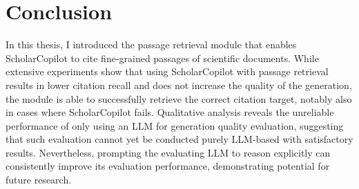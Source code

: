 \chapter{Conclusion}\label{conclusion}
In this thesis, I introduced the passage retrieval module that enables ScholarCopilot to cite fine-grained passages of scientific documents. While extensive experiments show that using ScholarCopilot with passage retrieval results in lower citation recall and does not increase the quality of the generation, the module is able to successfully retrieve the correct citation target, notably also in cases where ScholarCopilot fails. Qualitative analysis reveals the unreliable performance of only using an LLM for generation quality evaluation, suggesting that such evaluation cannot yet be conducted purely LLM-based with satisfactory results. Nevertheless, prompting the evaluating LLM to reason explicitly can consistently improve its evaluation performance, demonstrating potential for future research.
